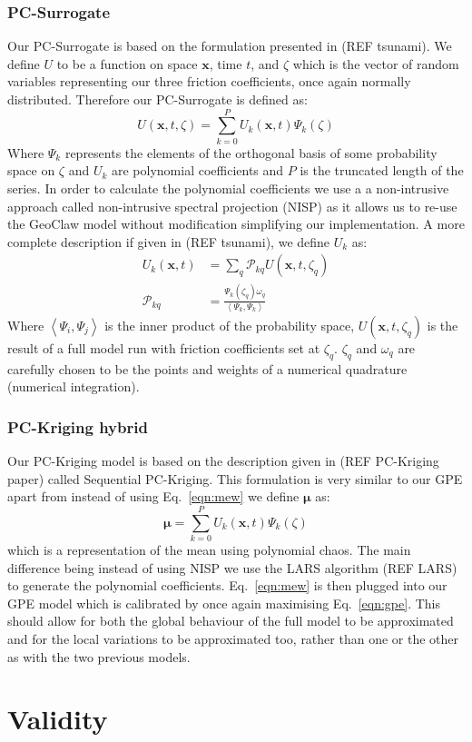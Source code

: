 \documentclass[12pt,a4paper]{article}
\begin{document}
\subsubsection{PC-Surrogate}
\noindent
Our PC-Surrogate is based on the formulation presented in (REF tsunami). We define $U$ to be a function on space $\bm{x}$, time $t$, and $\zeta$ which is the vector of random variables representing our three friction coefficients, once again normally distributed. Therefore our PC-Surrogate is defined as:
\begin{equation}
	U(\bm{x},t,\zeta)=\sum_{k=0}^{P}U_k(\bm{x},t)\Psi_k(\zeta)
\end{equation}
Where $\Psi_k$ represents the elements of the orthogonal basis of some probability space on $\zeta$ and $U_k$ are polynomial coefficients and $P$ is the truncated length of the series. In order to calculate the polynomial coefficients we use a a non-intrusive approach called non-intrusive spectral projection (NISP) as it allows us to re-use the GeoClaw model without modification simplifying our implementation. A more complete description if given in (REF tsunami), we define $U_k$ as:
\begin{align}
	U_k(\bm{x},t) &= \sum_{q}\mathcal{P}_{kq}U(\bm{x},t,\zeta_q) \\
	\mathcal{P}_{kq} &= \frac{\Psi_k(\zeta_q)\omega_q}{\left<\Psi_k, \Psi_k \right>}
\end{align}
Where $\left<\Psi_i,\Psi_j \right>$ is the inner product of the probability space, $U(\bm{x},t,\zeta_q)$ is the result of a full model run with friction coefficients set at $\zeta_q$. $\zeta_q$ and $\omega_q$ are carefully chosen to be the points and weights of a numerical quadrature (numerical integration).
\subsubsection{PC-Kriging hybrid}
\noindent
Our PC-Kriging model is based on the description given in (REF PC-Kriging paper) called Sequential PC-Kriging. This formulation is very similar to our GPE apart from instead of using Eq.~\eqref{eqn:mew} we define $\bm{\mu}$ as:
\begin{equation}
	\bm{\mu} = \sum_{k=0}^{P}U_k(\bm{x},t)\Psi_k(\zeta)
\end{equation}
which is a representation of the mean using polynomial chaos. The main difference being instead of using NISP we use the LARS algorithm (REF LARS) to generate the polynomial coefficients. Eq.~\eqref{eqn:mew} is then plugged into our GPE model which is calibrated by once again maximising Eq.~\eqref{eqn:gpe}. This should allow for both the global behaviour of the full model to be approximated and for the local variations to be approximated too, rather than one or the other as with the two previous models.
\section{Validity} \label{sec:val}


\end{document}
